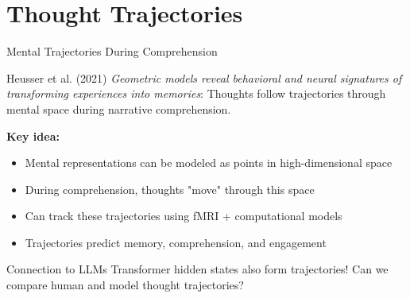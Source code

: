 \documentclass[aspectratio=169]{beamer}
\begin{document}
\section{Thought Trajectories}

\begin{frame}{Mental Trajectories During Comprehension 🧠}
\small
    \begin{block}{Heusser et al. (2021)}
        \textit{Geometric models reveal behavioral and neural signatures of transforming experiences into memories}: Thoughts follow trajectories through mental space during narrative comprehension.
    \end{block}

    \vspace{0.3cm}

    \textbf{Key idea:}
    \begin{itemize}\setlength{\itemsep}{0pt}
        \item Mental representations can be modeled as points in high-dimensional space
        \item During comprehension, thoughts "move" through this space
        \item Can track these trajectories using fMRI + computational models
        \item Trajectories predict memory, comprehension, and engagement
    \end{itemize}

    \vspace{0.3cm}

    \begin{alertblock}{Connection to LLMs}
        Transformer hidden states also form trajectories! Can we compare human and model thought trajectories?
    \end{alertblock}
\end{frame}
\end{document}
